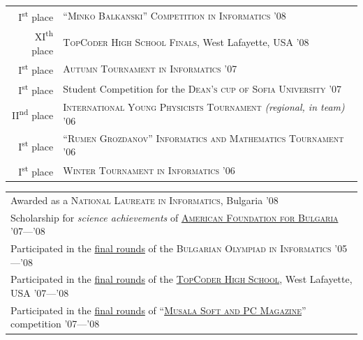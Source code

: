 \documentclass[a4paper,10pt]{article}
\def\myline{\color{linegray}\vline}
\begin{document}
{\vspace{-3mm}\hspace{3.5mm}\begin{tabular}{r!{\myline}p{14cm}}
	I\textsuperscript{st} place    &  \textsc{``Minko Balkanski''} \textsc{Competition in Informatics} \textsc{'08}\\
	XI\textsuperscript{th} place   &  \textsc{TopCoder High School Finals}, West Lafayette, USA \textsc{'08}\\
	I\textsuperscript{st} place    &  \textsc{Autumn Tournament in Informatics} \textsc{'07}\\
	I\textsuperscript{st} place    &  Student Competition for the \textsc{Dean's cup of Sofia University} \textsc{'07}\\
	II\textsuperscript{nd} place   &  \textsc{International Young Physicists Tournament} {\small\textit{(regional, in team)}} \textsc{'06}\\
	I\textsuperscript{st} place    &  \textsc{``Rumen Grozdanov''} \textsc{Informatics and Mathematics Tournament} \textsc{'06}\\
	I\textsuperscript{st} place    &  \textsc{Winter Tournament in Informatics} \textsc{'06}\\
\end{tabular}
\medskip

\hspace{3mm}\begin{tabular}{@{•\enskip}p{14.5cm}}
	Awarded as a \textsc{National Laureate in Informatics}, Bulgaria \textsc{'08}\\
        Scholarship for \textit{science achievements} of \href{http://www.afbulgaria.org/}{\textsc{American Foundation for Bulgaria}} \textsc{'07}---\textsc{'08}\\
	Participated in the \underline{final rounds} of the \textsc{Bulgarian Olympiad in Informatics} \textsc{'05}---\textsc{'08}\\
        Participated in the \underline{final rounds} of the \href{http://community.topcoder.com/tc?module=Static&d1=tournaments&d2=home}{\textsc{TopCoder High School}}, West Lafayette, USA \textsc{'07}---\textsc{'08}\\
        Participated in the \underline{final rounds} of ``\href{http://konkurs.musala.com/}{\textsc{Musala Soft and PC Magazine}}'' competition \textsc{'07}---\textsc{'08}\\
\end{tabular}

}
\end{document}
